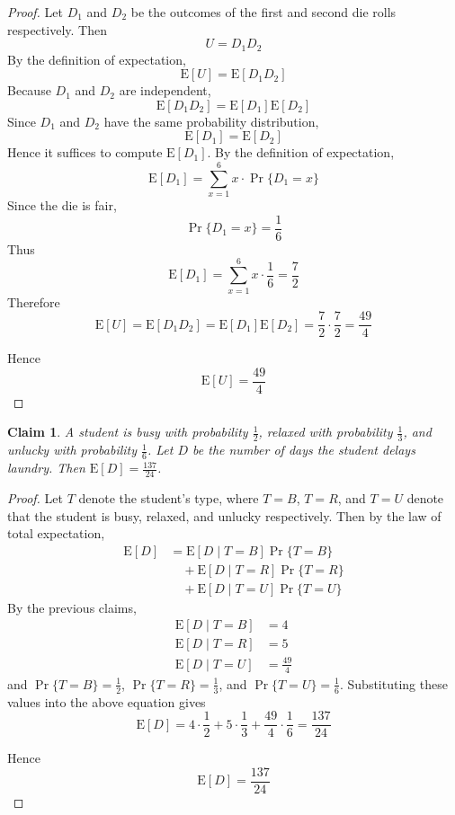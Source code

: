 \documentclass{article}
\newtheorem{claim}{Claim}
\begin{document}
\begin{proof}
    Let $D_1$ and $D_2$ be the outcomes of the first and second die rolls respectively. 
    Then
    \[
    U = D_1D_2
    \]
    By the definition of expectation,
    \[
    \mathrm{E}[U] = \mathrm{E}[D_1D_2]
    \]
    Because $D_1$ and $D_2$ are independent,
    \[
    \mathrm{E}[D_1D_2] = \mathrm{E}[D_1]\mathrm{E}[D_2]
    \]
    Since $D_1$ and $D_2$ have the same probability distribution,
    \[
    \mathrm{E}[D_1] = \mathrm{E}[D_2]
    \]
    Hence it suffices to compute $\mathrm{E}[D_1]$. By the definition of expectation, 
    \[
    \mathrm{E}[D_1] = \sum_{x=1}^{6} x \cdot \Pr\{D_1 = x\}
    \]
    Since the die is fair,
    \[
    \Pr\{D_1 = x\} = \frac{1}{6}
    \]
    Thus
    \[
    \mathrm{E}[D_1] = \sum_{x=1}^{6} x \cdot \frac{1}{6} = \frac{7}{2}
    \]
    Therefore
    \[
    \mathrm{E}[U] = \mathrm{E}[D_1D_2] = \mathrm{E}[D_1]\mathrm{E}[D_2] 
    = \frac{7}{2} \cdot \frac{7}{2} = \frac{49}{4}
    \]

    \medskip

    Hence
    \[
    \mathrm{E}[U] = \frac{49}{4}
    \]
\end{proof}

\begin{claim}
    A student is busy with probability $\frac{1}{2}$, relaxed with probability 
    $\frac{1}{3}$, and unlucky with probability $\frac{1}{6}$. Let $D$ be the number 
    of days the student delays laundry. Then $\mathrm{E}[D] = \frac{137}{24}$.
\end{claim}

\begin{proof}
    Let $T$ denote the student's type, where $T = B$, $T = R$, and $T = U$ denote 
    that the student is busy, relaxed, and unlucky respectively. Then by the law of 
    total expectation, 
    \[
    \begin{aligned}
    \mathrm{E}[D] &= \mathrm{E}[D \mid T = B]\Pr\{T = B\} \\
    &\quad + \mathrm{E}[D \mid T = R]\Pr\{T = R\} \\
    &\quad + \mathrm{E}[D \mid T = U]\Pr\{T = U\}
    \end{aligned}
    \]
    By the previous claims,
    \[
    \begin{aligned}
    \mathrm{E}[D \mid T = B] &= 4 \\
    \mathrm{E}[D \mid T = R] &= 5 \\
    \mathrm{E}[D \mid T = U] &= \frac{49}{4}
    \end{aligned}
    \]
    and $\Pr\{T = B\} = \frac{1}{2}$, $\Pr\{T = R\} = \frac{1}{3}$, and 
    $\Pr\{T = U\} = \frac{1}{6}$. Substituting these values into the above equation 
    gives
    \[
    \mathrm{E}[D] = 4 \cdot \frac{1}{2} + 5 \cdot \frac{1}{3} + 
    \frac{49}{4} \cdot \frac{1}{6} = \frac{137}{24}
    \]

    \medskip

    Hence
    \[
    \mathrm{E}[D] = \frac{137}{24}
    \]
\end{proof}
\end{document}
